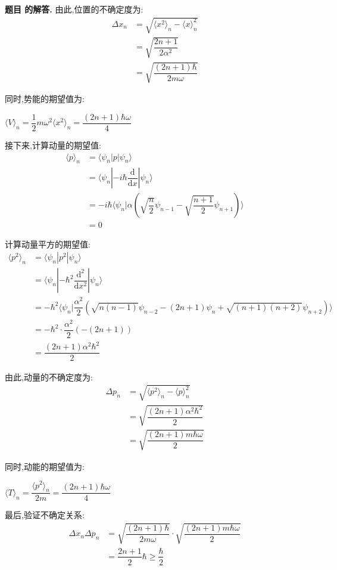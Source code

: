 \documentclass[12pt, a4paper, oneside]{ctexart}
\newcounter{problemname}
\newenvironment{solution}
  {\par\noindent\textbf{题目 \theproblemname 的解答. }}
  {\par}
\begin{document}
\begin{solution}
  由此,位置的不确定度为:
  \begin{align*}
    \Delta x_n &= \sqrt{\langle x^2 \rangle_n - \langle x \rangle^2_n} \\
    &= \sqrt{\dfrac{2n+1}{2\alpha^2}} \\
    &= \sqrt{\dfrac{(2n+1)\hbar}{2m\omega}}
  \end{align*}

  同时,势能的期望值为:

  \centerline{$\langle V \rangle_n = \dfrac{1}{2} m \omega^2 \langle x^2 \rangle_n = \dfrac{(2n+1)\hbar \omega}{4}$}

  接下来,计算动量的期望值:
  \begin{align*}
    \langle p \rangle_n &= \langle \psi_n | p | \psi_n \rangle \\
    &= \langle \psi_n | -i\hbar \dfrac{\mathrm{d}}{\mathrm{d}x} | \psi_n \rangle \\
    &= -i\hbar \langle \psi_n | \alpha (\sqrt{\dfrac{n}{2}} \psi_{n-1} - \sqrt{\dfrac{n+1}{2}} \psi_{n+1}) \rangle \\
    &= 0
  \end{align*}

  计算动量平方的期望值:
  \begin{align*}
    \langle p^2 \rangle_n &= \langle \psi_n | p^2 | \psi_n \rangle \\
    &= \langle \psi_n | -\hbar^2 \dfrac{\mathrm{d}^2}{\mathrm{d}x^2} | \psi_n \rangle \\
    &= -\hbar^2 \langle \psi_n | \dfrac{\alpha^2}{2} (\sqrt{n(n-1)}\psi_{n-2} - (2n+1)\psi_n + \sqrt{(n+1)(n+2)}\psi_{n+2}) \rangle \\
    &= -\hbar^2 \cdot \dfrac{\alpha^2}{2} (- (2n+1)) \\
    &= \dfrac{(2n+1)\alpha^2 \hbar^2}{2}
  \end{align*}

  由此,动量的不确定度为:
  \begin{align*}
    \Delta p_n &= \sqrt{\langle p^2 \rangle_n - \langle p \rangle^2_n} \\
    &= \sqrt{\dfrac{(2n+1)\alpha^2 \hbar^2}{2}} \\
    &= \sqrt{\dfrac{(2n+1)m\hbar\omega}{2}}
  \end{align*}

  同时,动能的期望值为:

  \centerline{$\langle T \rangle_n = \dfrac{\langle p^2 \rangle_n}{2m} = \dfrac{(2n+1)\hbar \omega}{4}$}

  最后,验证不确定关系:
  \begin{align*}
    \Delta x_n \Delta p_n &= \sqrt{\dfrac{(2n+1)\hbar}{2m\omega}} \cdot \sqrt{\dfrac{(2n+1)m\hbar\omega}{2}} \\
    &= \dfrac{2n+1}{2} \hbar \geq \dfrac{\hbar}{2}
  \end{align*}
\end{solution}
\end{document}
